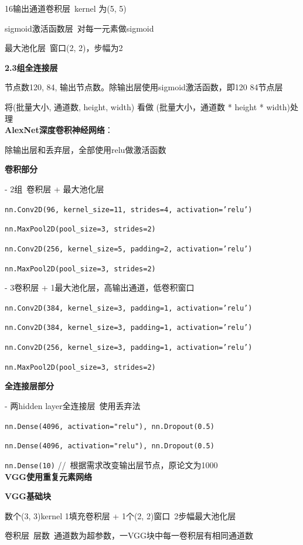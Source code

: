 \documentclass[UTF8]{ctexart}
\begin{document}
  \quad 16输出通道卷积层\ kernel 为(5, 5)

  \quad sigmoid激活函数层\ 对每一元素做sigmoid

  \quad 最大池化层\ 窗口(2, 2)，步幅为2

  \textbf{2.3组全连接层}

  \quad 节点数120, 84, 输出节点数。除输出层使用sigmoid激活函数，即120 84节点层

  \quad 将(批量大小, 通道数, height, width) 看做 (批量大小，通道数 * height * width)处理\\
\textbf{AlexNet深度卷积神经网络}：

  除输出层和丢弃层，全部使用relu做激活函数

  \textbf{卷积部分}
  
  \quad - 2组\ 卷积层 + 最大池化层
  
  \quad \texttt{nn.Conv2D(96, kernel\_size=11, strides=4, activation='relu')}

  \quad \texttt{nn.MaxPool2D(pool\_size=3, strides=2)}

  \quad \texttt{nn.Conv2D(256, kernel\_size=5, padding=2, activation='relu')}

  \quad \texttt{nn.MaxPool2D(pool\_size=3, strides=2)}
  
  \quad - 3卷积层 + 1最大池化层，高输出通道，低卷积窗口
  
  \quad \texttt{nn.Conv2D(384, kernel\_size=3, padding=1, activation='relu')}
  
  \quad \texttt{nn.Conv2D(384, kernel\_size=3, padding=1, activation='relu')} 
  
  \quad \texttt{nn.Conv2D(256, kernel\_size=3, padding=1, activation='relu')}
  
  \quad \texttt{nn.MaxPool2D(pool\_size=3, strides=2)}

  \textbf{全连接层部分}
  
  \quad - 两hidden layer全连接层\ 使用丢弃法

  \quad \texttt{nn.Dense(4096, activation="relu"), nn.Dropout(0.5)}
  
  \quad \texttt{nn.Dense(4096, activation="relu"), nn.Dropout(0.5)}
  
  \quad \texttt{nn.Dense(10)} //\ 根据需求改变输出层节点，原论文为1000\\
\textbf{VGG使用重复元素网络}

  \textbf{VGG基础块}

  \quad 数个(3, 3)kernel 1填充卷积层 + 1个(2, 2)窗口\ 2步幅最大池化层

  \quad 卷积层\ 层数\ 通道数为超参数，一VGG块中每一卷积层有相同通道数
\end{document}
